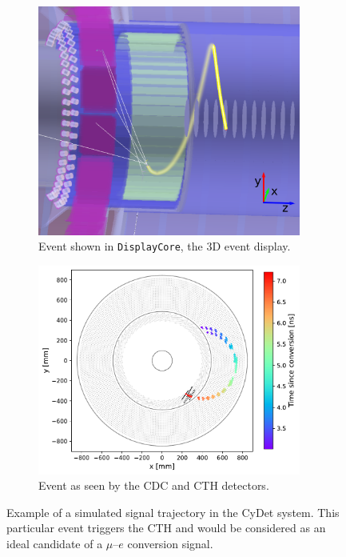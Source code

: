 \begin{figure}
    \centering
    \captionsetup[subfigure]{justification=centering}
    \begin{subfigure}[t]{0.43\textwidth}
    \centering
    \includegraphics[width=0.95\textwidth]{chapter3/signal_event_display_crop_axes.pdf}
    \caption{Event shown in \texttt{DisplayCore}, the 3D event display.}
    \end{subfigure}
    \hfill
    \begin{subfigure}[t]{0.48\textwidth}
    \centering
    \includegraphics[width=0.95\textwidth]{chapter3/cydet_signal_track_v2.pdf}
    \caption{Event as seen by the CDC and CTH detectors.}
    \end{subfigure}
    
    \caption{Example of a simulated signal trajectory in the CyDet system. This particular event triggers the CTH and would be considered as an ideal candidate of a $\mu$--$e$ conversion signal.}
    \label{fig:signal_event}
\end{figure}

